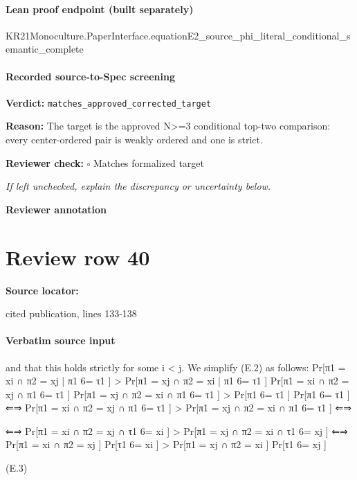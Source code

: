\documentclass[10pt]{article}
\newcommand{\reviewerbox}{%
  \par\noindent\fbox{\parbox{0.96\linewidth}{\rule{0pt}{0.38in}}}\par
}
\newcommand{\reviewmatch}[1]{%
  \par\noindent\textbf{Reviewer check:} $\square$\; #1\par
  \noindent\emph{If left unchecked, explain the discrepancy or uncertainty below.}\par
}
\begin{document}
\paragraph{Lean proof endpoint (built separately)}\begin{ReviewVerbatim}
KR21Monoculture.PaperInterface.equationE2_source_phi_literal_conditional_semantic_complete
\end{ReviewVerbatim}

\paragraph{Recorded source-to-Spec screening}
\textbf{Verdict:} \texttt{matches\_approved\_corrected\_target}
\\
{\raggedright
\textbf{Reason:} The target is the approved N>=3 conditional top-\allowbreak{}two comparison:\allowbreak{} every center-\allowbreak{}ordered pair is weakly ordered and one is strict.\allowbreak{}
\par}
\reviewmatch{Matches formalized target}
\noindent\textbf{Reviewer annotation}\par
\reviewerbox
\clearpage
\hypertarget{source-claim-027748e89e133285}{}
\section*{Review row 40}
\textbf{Source locator:} {\footnotesize\raggedright cited publication, lines 133-\allowbreak{}138\par}
\paragraph{Verbatim source input}
\begin{ReviewVerbatim}
and that this holds strictly for some i < j. We simplify (E.2) as follows:
Pr[π1 = xi ∩ π2 = xj | π1 6= τ1 ] > Pr[π1 = xj ∩ π2 = xi | π1 6= τ1 ]
Pr[π1 = xi ∩ π2 = xj ∩ π1 6= τ1 ]
Pr[π1 = xj ∩ π2 = xi ∩ π1 6= τ1 ]
>
Pr[π1 6= τ1 ]
Pr[π1 6= τ1 ]
⇐⇒ Pr[π1 = xi ∩ π2 = xj ∩ π1 6= τ1 ] > Pr[π1 = xj ∩ π2 = xi ∩ π1 6= τ1 ]
⇐⇒

⇐⇒ Pr[π1 = xi ∩ π2 = xj ∩ τ1 6= xi ] > Pr[π1 = xj ∩ π2 = xi ∩ τ1 6= xj ]
⇐⇒ Pr[π1 = xi ∩ π2 = xj ] Pr[τ1 6= xi ] > Pr[π1 = xj ∩ π2 = xi ] Pr[τ1 6= xj ]

(E.3)
\end{ReviewVerbatim}
\end{document}
